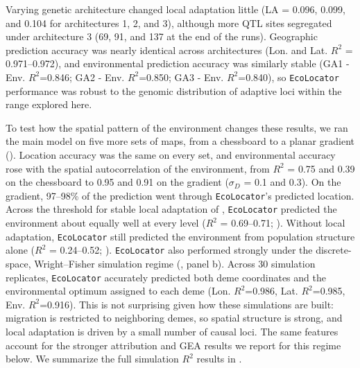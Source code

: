 \documentclass[]{article}
\newcommand{\ecolocator}{\texttt{EcoLocator}\xspace}
\begin{document}
Varying genetic architecture changed local adaptation little
(LA = 0.096, 0.099, and 0.104 for architectures 1, 2, and 3),
although more QTL sites segregated under architecture 3
(69, 91, and 137 at the end of the runs).
Geographic prediction accuracy was nearly identical across architectures
(Lon. and Lat. $R^2$ = 0.971--0.972),
and environmental prediction accuracy was similarly stable
(GA1 - Env. $R^2$=0.846;
GA2 - Env. $R^2$=0.850;
GA3 - Env. $R^2$=0.840),
so \ecolocator performance was robust
to the genomic distribution of adaptive loci within the range explored here.

To test how the spatial pattern of the environment changes these results,
we ran the main model on five more sets of maps,
from a chessboard to a planar gradient ().
Location accuracy was the same on every set,
and environmental accuracy rose with the spatial autocorrelation
of the environment,
from $R^2$ = 0.75 and 0.39 on the chessboard
to 0.95 and 0.91 on the gradient ($\sigma_D$ = 0.1 and 0.3).
On the gradient, 97--98\% of the prediction went through
\ecolocator's predicted location.
Across the threshold for stable local adaptation of
\citet{sakamoto_mutation_2024},
\ecolocator predicted the environment about equally well at every level
($R^2$ = 0.69--0.71; ).
Without local adaptation,
\ecolocator still predicted the environment from population structure alone
($R^2$ = 0.24--0.52; ).
\ecolocator also performed strongly under the discrete-space,
Wright--Fisher simulation regime (, panel b).
Across 30 simulation replicates,
\ecolocator accurately predicted both deme coordinates
and the environmental optimum assigned to each deme
(Lon. $R^2$=0.986,
Lat. $R^2$=0.985,
Env. $R^2$=0.916).
This is not surprising given how these simulations are built:
migration is restricted to neighboring demes,
so spatial structure is strong,
and local adaptation is driven by a small number of causal loci.
The same features account for the stronger attribution
and GEA results we report for this regime below.
We summarize the full simulation $R^2$ results in .
\end{document}
